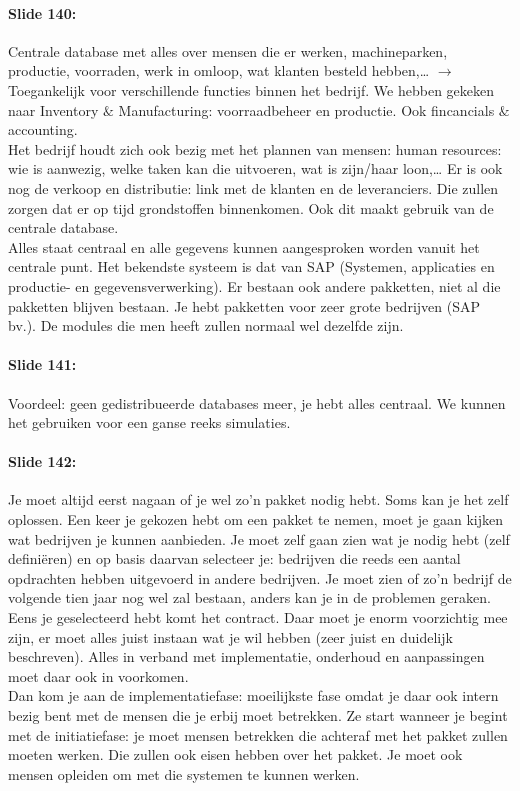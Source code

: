 \documentclass[10pt,a4paper]{report}
\begin{document}
\paragraph{Slide 140:} Centrale database met alles over mensen die er werken, machineparken, productie, voorraden, werk in omloop, wat klanten besteld hebben,… $\rightarrow$ Toegankelijk voor verschillende functies binnen het bedrijf. We hebben gekeken naar Inventory $\&$ Manufacturing: voorraadbeheer en productie. Ook fincancials $\&$ accounting.\\
Het bedrijf houdt zich ook bezig met het plannen van mensen: human resources: wie is aanwezig, welke taken kan die uitvoeren, wat is zijn/haar loon,… Er is ook nog de verkoop en distributie: link met de klanten en de leveranciers. Die zullen zorgen dat er op tijd grondstoffen binnenkomen. Ook dit maakt gebruik van de centrale database.\\
Alles staat centraal en alle gegevens kunnen aangesproken worden vanuit het centrale punt.
Het bekendste systeem is dat van SAP (Systemen, applicaties en productie- en gegevensverwerking). Er bestaan ook andere pakketten, niet al die pakketten blijven bestaan. Je hebt pakketten voor zeer grote bedrijven (SAP bv.). De modules die men heeft zullen normaal wel dezelfde zijn.

\paragraph{Slide 141:} Voordeel: geen gedistribueerde databases meer, je hebt alles centraal. We kunnen het gebruiken voor een ganse reeks simulaties. 

\paragraph{Slide 142:} Je moet altijd eerst nagaan of je wel zo'n pakket nodig hebt. Soms kan je het zelf oplossen. Een keer je gekozen hebt om een pakket te nemen, moet je gaan kijken wat bedrijven je kunnen aanbieden. Je moet zelf gaan zien wat je nodig hebt (zelf defini\"eren) en op basis daarvan selecteer je: bedrijven die reeds een aantal opdrachten hebben uitgevoerd in andere bedrijven. Je moet zien of zo'n bedrijf de volgende tien jaar nog wel zal bestaan, anders kan je in de problemen geraken. \\
Eens je geselecteerd hebt komt het contract. Daar moet je enorm voorzichtig mee zijn, er moet alles juist instaan wat je wil hebben (zeer juist en duidelijk beschreven). Alles in verband met implementatie, onderhoud en aanpassingen moet daar ook in voorkomen.\\
Dan kom je aan de implementatiefase: moeilijkste fase omdat je daar ook intern bezig bent met de mensen die je erbij moet betrekken. Ze start wanneer je begint met de initiatiefase: je moet mensen betrekken die achteraf met het pakket zullen moeten werken. Die zullen ook eisen hebben over het pakket. Je moet ook mensen opleiden om met die systemen te kunnen werken. 
\end{document}
